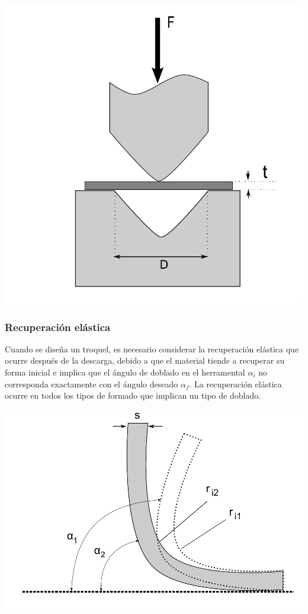 \begin{center}
\includegraphics[scale=0.35]{src/ch2/fuerza_doblado}
\label{fig:fuerza_doblado}
\end{center}


\subsubsection{Recuperación elástica}

Cuando se diseña un troquel, es necesario considerar la recuperación elástica 
que ocurre después de la descarga, debido a que el material tiende a recuperar su forma 
inicial e implica que el ángulo de doblado en el herramental $\alpha_i$ no corresponda exactamente con el 
ángulo deseado $\alpha_f$. La recuperación elástica ocurre en todos los tipos de formado 
que implican un tipo de doblado.\\

\begin{center}
\includegraphics[scale=0.35]{src/ch2/springback}
\label{fig:springback}
\end{center}

